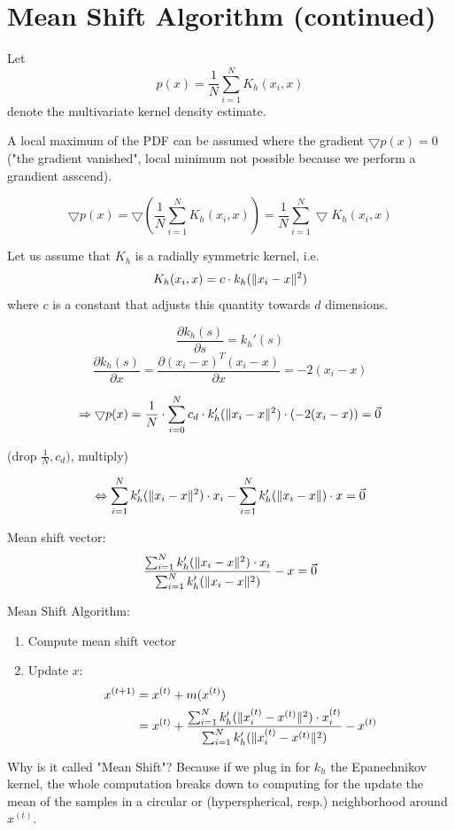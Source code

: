 \documentclass{scrartcl}
\DeclarePairedDelimiter\norm{\lVert}{\rVert}%
\begin{document}
\section{Mean Shift Algorithm (continued)}
Let 
\[p(x) = \frac{1}{N} \sum_{i=1}^N K_{h}(x_i, x)\]
denote the multivariate kernel density estimate.

A local maximum of the PDF can be assumed where the gradient \(\bigtriangledown p(x) = 0\) ("the gradient vanished", local minimum not possible because we perform a grandient asscend).

\[\bigtriangledown p(x) = \bigtriangledown(\frac{1}{N} \sum_{i=1}^N K_h (x_i,x)) = \frac{1}{N} \sum_{i=1}^N \bigtriangledown K_h(x_i, x)\]

Let us assume that \(K_h\) is a radially symmetric kernel, i.e. 
\[K_h(x_i, x) = c \cdot k_h(\norm{x_i -x}^2)\]
where \(c\) is a constant that adjusts this quantity towards \(d\) dimensions.

\[\frac{\partial k_h(s)}{\partial s} = k_h'(s)\]
\[\frac{\partial k_h(s)}{\partial x} = \frac{\partial (x_i -x)^T(x_i -x)}{\partial x} = -2 (x_i - x)\]

\[\Rightarrow \bigtriangledown p(x) = \frac{1}{N} \cdot \sum_{i=0}^N c_d \cdot k_h'(\norm{x_i - x}^2) \cdot (-2 (x_i - x)) = \vec{0}\]

(drop \(\frac{1}{N}, c_d)\), multiply)

\[\Leftrightarrow \sum_{i=1}^N k_h'(\norm{x_i -x}^2) \cdot x_i - \sum_{i=1}^N k_h'(\norm{x_i -x}) \cdot x = \vec{0}\]

Mean shift vector:
\[\frac{\sum_{i=1}^N k_h'(\norm{x_i -x}^2) \cdot x_i}{\sum_{i=1}^N k_h'(\norm{x_i-x}^2)} - x = \vec{0}\]

Mean Shift Algorithm:
\begin{enumerate}
    \item
        Compute mean shift vector  
    \item
        Update \(x\):         
        \begin{align*}
            x^{(t+1)} &= x^{(t)} + m(x^{(t)})\\
            &= x^{(t)} + \frac{\sum_{i=1}^N k_h'(\norm{x_i^{(t)} -x^{(t)}}^2) \cdot x_i^{(t)}}{\sum_{i=1}^N k_h'(\norm{x_i^{(t)}-x^{(t)}}^2)} - x^{(t)} 
        \end{align*}
\end{enumerate}

Why is it called "Mean Shift"? Because if we plug in for \(k_h\) the Epanechnikov kernel,  the whole computation breaks down to computing for the update the mean of the samples in a circular or (hyperspherical, resp.) neighborhood around \(x^{(t)}\).
\end{document}
